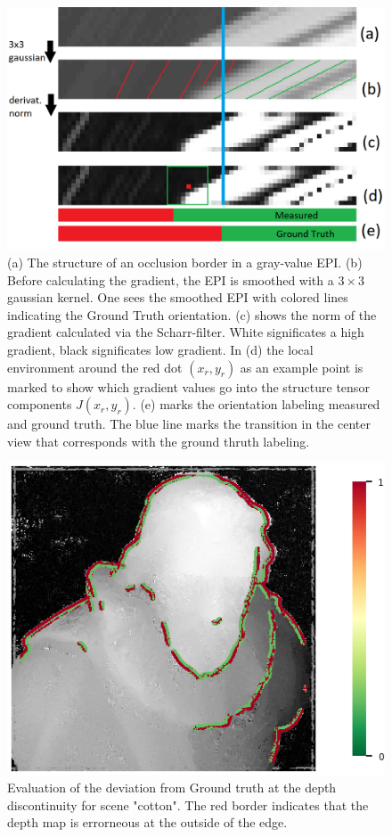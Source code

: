 \documentclass  [
  paper    = a4,
  BCOR     = 10mm,
  twoside,
  fontsize = 12pt,
  fleqn,
  toc      = bibnumbered,
  toc      = listofnumbered,
  numbers  = noendperiod,
  headings = normal,
  listof   = leveldown,
  version  = 3.03
]                                       {scrreprt}
\begin{document}
  \begin{figure}
  	\centering
  	\includegraphics[width=0.7\linewidth]{images/occlusion_painted2}
  	\caption[Occlusion in an EPI]{(a) The structure of an occlusion border in a gray-value EPI. (b) Before calculating the gradient, the EPI is smoothed with a $3 \times 3$ gaussian kernel. One sees the smoothed EPI with colored lines indicating the Ground Truth orientation. (c) shows the norm of the gradient calculated via the Scharr-filter. White significates a high gradient, black significates low gradient. In (d) the local environment around the red dot $(x_r,y_r)$ as an example point is marked to show which gradient values go into the structure tensor components $J(x_r,y_r)$. (e) marks the orientation labeling measured and ground truth. The blue line marks the transition in the center view that corresponds with the ground thruth labeling. }
  	\label{fig:occlusion}
  \end{figure}
\begin{figure}
	\centering
	\includegraphics[width=0.7\linewidth]{images/cotton_discontinuities_0070}
	\caption[Discontinuity evaluation]{Evaluation of the deviation from Ground truth at the depth discontinuity for scene "cotton". The red border indicates that the depth map is errorneous at the outside of the edge.}
	\label{fig:cottondiscontinuities0070}
\end{figure}
  
\end{document}

